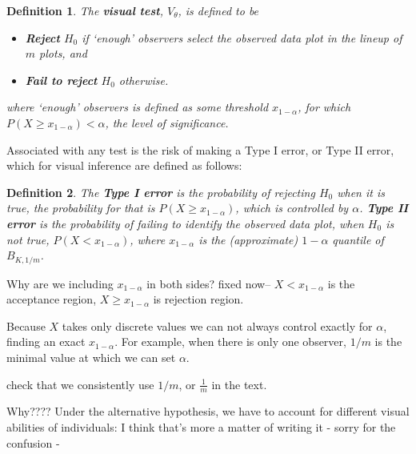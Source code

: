 \documentclass{article}
\newcommand{\red}[1]{{\color{red} #1}} %
\newcommand{\green}[1]{{\color{green} #1}} %
\newtheorem{dfn}{Definition}[section]
\begin{document}
\begin{dfn}\label{dfn:test}
The \textbf{visual test}, $V_{\theta}$, is defined to be 
\begin{itemize}\itemsep-3pt
\item \textbf{Reject} $H_0$ if `enough' observers select the observed data plot in the lineup of $m$ plots, and
\item \textbf{Fail to reject} $H_0$  otherwise. %
\end{itemize}
where `enough' observers is defined as some threshold $x_{1-\alpha}$, for which $P(X \ge x_{1-\alpha}) < \alpha$, the level of significance.
\end{dfn}

Associated with any test is the risk of making a Type I error, or Type II error, which for visual inference are defined as follows: 

\begin{dfn}\label{dfn:error}
The \textbf{Type I error} is the probability of rejecting $H_0$ when it is true, the probability for that is $P(X \ge x_{1-\alpha})$, which is controlled by $\alpha$.
\textbf{Type II error} is the probability of failing to identify the observed data plot, when $H_0$ is not true, $P( X <  x_{1-\alpha})$, where $x_{1 - \alpha}$ is the (approximate) $1-\alpha$ quantile of  $B_{K, 1/m}$.
\end{dfn}

\green{Why are we including $x_{1-\alpha}$ in both sides?}
\red{fixed  now-- $X < x_{1 - \alpha}$ is the acceptance region, $X \ge x_{1-\alpha}$ is rejection region.}

\noindent Because $X$ takes only discrete values we can not always control exactly for $\alpha$, finding an exact $x_{1-\alpha}$. For example, when there is only one observer, $1/m$ is the minimal value at which we can set $\alpha$.

\green{check that we consistently use $1/m$, or $\frac{1}{m}$ in the text}.

 

\green{Why???? Under the alternative hypothesis, we have to account for different visual abilities of  individuals:} 
\red{I think that's more a matter of writing it - sorry for the confusion - }
\end{document}
